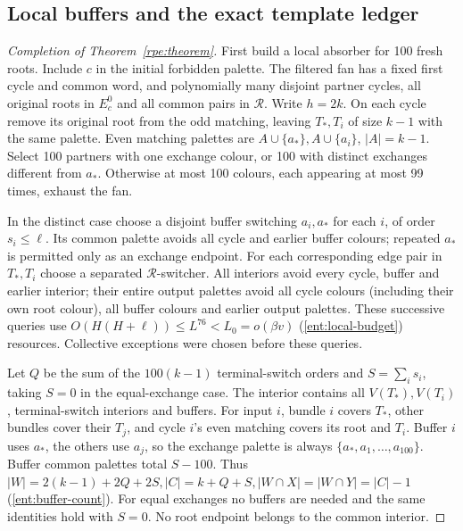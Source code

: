 \subsection{Local buffers and the exact template ledger}
\label{ent:local-subsection}
\begin{proof}[Completion of Theorem~\ref{rpe:theorem}]
First build a local absorber for 100 fresh roots. Include $c$ in the initial forbidden palette. The filtered fan has a fixed first cycle
and common word, and polynomially many disjoint partner cycles, all
original roots in $E_c^0$ and all common pairs in $\mathcal{R}$. Write $h=2k$. On each cycle remove its original root from the odd matching, leaving $T_*,T_i$ of size $k-1$ with the same palette. Even matching palettes are $A\cup\{a_*\},A\cup\{a_i\}$, $|A|=k-1$. Select 100 partners with one exchange colour, or 100 with distinct exchanges different from $a_*$. Otherwise at most
100 colours, each appearing at most 99 times, exhaust the fan.

In the distinct case choose a disjoint buffer switching $a_i,a_*$ for each $i$, of order $s_i\le\ell$. Its common palette avoids all cycle and earlier buffer colours; repeated $a_*$ is permitted only as an exchange endpoint. For each corresponding edge pair in $T_*,T_i$ choose a separated $\mathcal{R}$-switcher. All interiors avoid every cycle, buffer and earlier interior; their entire output
palettes avoid all cycle colours (including their own root colour),
all buffer colours and earlier output palettes. These successive
queries use \label{ent:local-budget}$O(H(H+\ell))\le{}L^{76}<L_0=o(\beta{}v)$ \textup{(\ref{ent:local-budget})} resources. Collective exceptions were chosen before these queries.

Let $Q$ be the sum of the $100(k-1)$ terminal-switch orders and $S=\sum_is_i$, taking $S=0$ in the equal-exchange case. The interior contains all $V(T_*),V(T_i)$, terminal-switch interiors and buffers. For input $i$, bundle $i$ covers $T_*$, other bundles cover their $T_j$, and cycle $i$'s even matching covers its root and $T_i$. Buffer $i$ uses $a_*$, the others use $a_j$, so the exchange palette is always $\{a_*,a_1,\ldots,a_{100}\}$. Buffer common palettes total $S-100$. Thus \label{ent:buffer-count}$|W|=2(k-1)+2Q+2S,|C|=k+Q+S,|W\cap{}X|=|W\cap{}Y|=|C|-1$ \textup{(\ref{ent:buffer-count})}. For equal exchanges no buffers are needed and the same identities
hold with $S=0$. No root endpoint belongs to the common interior.


\end{proof}
